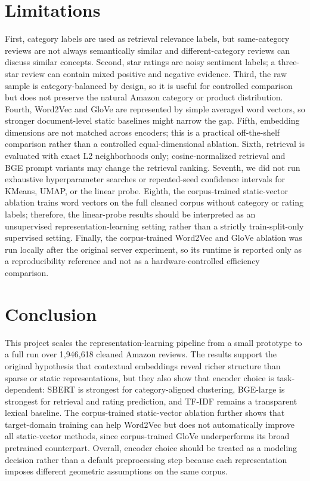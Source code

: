 \documentclass{article}
\begin{document}
\section{Limitations}
First, category labels are used as retrieval relevance labels, but same-category reviews are not always semantically similar and different-category reviews can discuss similar concepts. Second, star ratings are noisy sentiment labels; a three-star review can contain mixed positive and negative evidence. Third, the raw sample is category-balanced by design, so it is useful for controlled comparison but does not preserve the natural Amazon category or product distribution. Fourth, Word2Vec and GloVe are represented by simple averaged word vectors, so stronger document-level static baselines might narrow the gap. Fifth, embedding dimensions are not matched across encoders; this is a practical off-the-shelf comparison rather than a controlled equal-dimensional ablation. Sixth, retrieval is evaluated with exact L2 neighborhoods only; cosine-normalized retrieval and BGE prompt variants may change the retrieval ranking. Seventh, we did not run exhaustive hyperparameter searches or repeated-seed confidence intervals for KMeans, UMAP, or the linear probe. Eighth, the corpus-trained static-vector ablation trains word vectors on the full cleaned corpus without category or rating labels; therefore, the linear-probe results should be interpreted as an unsupervised representation-learning setting rather than a strictly train-split-only supervised setting. Finally, the corpus-trained Word2Vec and GloVe ablation was run locally after the original server experiment, so its runtime is reported only as a reproducibility reference and not as a hardware-controlled efficiency comparison.

\section{Conclusion}
This project scales the representation-learning pipeline from a small prototype to a full run over 1,946,618 cleaned Amazon reviews. The results support the original hypothesis that contextual embeddings reveal richer structure than sparse or static representations, but they also show that encoder choice is task-dependent: SBERT is strongest for category-aligned clustering, BGE-large is strongest for retrieval and rating prediction, and TF-IDF remains a transparent lexical baseline. The corpus-trained static-vector ablation further shows that target-domain training can help Word2Vec but does not automatically improve all static-vector methods, since corpus-trained GloVe underperforms its broad pretrained counterpart. Overall, encoder choice should be treated as a modeling decision rather than a default preprocessing step because each representation imposes different geometric assumptions on the same corpus.
\end{document}
